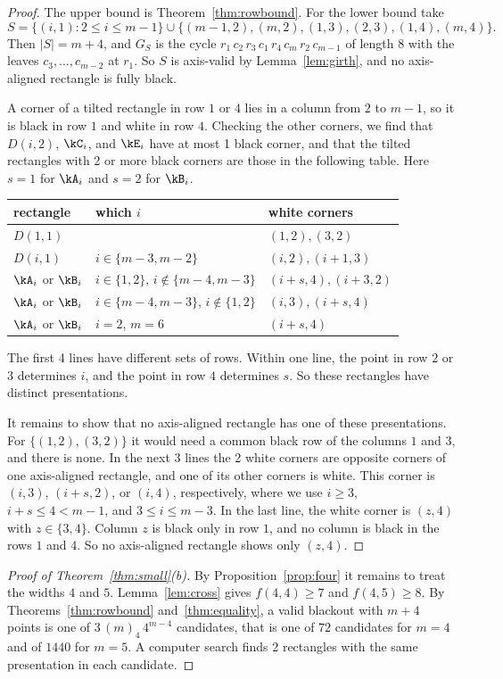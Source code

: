 \begin{proof}
The upper bound is Theorem~\ref{thm:rowbound}. For the lower bound take
\[
S=\{(i,1):2\le i\le m-1\}\cup\{(m-1,2),(m,2),(1,3),(2,3),(1,4),(m,4)\}.
\]
Then $|S|=m+4$, and $G_S$ is the cycle $r_1\,c_2\,r_3\,c_1\,r_4\,c_m\,r_2\,c_{m-1}$ of
length $8$ with the leaves $c_3,\dots,c_{m-2}$ at $r_1$. So $S$ is axis-valid by
Lemma~\ref{lem:girth}, and no axis-aligned rectangle is fully black.

A corner of a tilted rectangle in row $1$ or $4$ lies in a column from $2$ to $m-1$, so it
is black in row $1$ and white in row $4$. Checking the other corners, we find that $D(i,2)$, $\kC_i$, and $\kE_i$ have at most 1 black corner, and that the tilted
rectangles with 2 or more black corners are those in the following table. Here $s=1$ for
$\kA_i$ and $s=2$ for $\kB_i$.
\begin{center}\small
\begin{tabular}{@{}lll@{}}
\toprule
rectangle & which $i$ & white corners\\
\midrule
$D(1,1)$ & & $(1,2),(3,2)$\\
$D(i,1)$ & $i\in\{m-3,m-2\}$ & $(i,2),(i+1,3)$\\
$\kA_i$ or $\kB_i$ & $i\in\{1,2\}$, $i\notin\{m-4,m-3\}$ & $(i+s,4),(i+3,2)$\\
$\kA_i$ or $\kB_i$ & $i\in\{m-4,m-3\}$, $i\notin\{1,2\}$ & $(i,3),(i+s,4)$\\
$\kA_i$ or $\kB_i$ & $i=2$, $m=6$ & $(i+s,4)$\\
\bottomrule
\end{tabular}
\end{center}
The first 4 lines have different sets of rows. Within one line, the point in row $2$ or
$3$ determines $i$, and the point in row $4$ determines $s$. So these rectangles have
distinct presentations.

It remains to show that no axis-aligned rectangle has one of these presentations. For
$\{(1,2),(3,2)\}$ it would need a common black row of the columns $1$ and $3$, and there is
none. In the next 3 lines the 2 white corners are opposite corners of one axis-aligned
rectangle, and one of its other corners is white. This corner is $(i,3)$, $(i+s,2)$, or
$(i,4)$, respectively, where we use $i\ge3$, $i+s\le4<m-1$, and $3\le i\le m-3$. In the
last line, the white corner is $(z,4)$ with $z\in\{3,4\}$. Column $z$ is black only in row
$1$, and no column is black in the rows $1$ and $4$. So no axis-aligned rectangle shows
only $(z,4)$.
\end{proof}

\begin{proof}[Proof of Theorem~\ref{thm:small}(b)]
By Proposition~\ref{prop:four} it remains to treat the widths $4$ and $5$.
Lemma~\ref{lem:cross} gives $f(4,4)\ge7$ and $f(4,5)\ge8$. By Theorems~\ref{thm:rowbound}
and~\ref{thm:equality}, a valid blackout with $m+4$ points is one of $3\,(m)_4\,4^{m-4}$
candidates, that is one of $72$ candidates for $m=4$ and of $1440$ for $m=5$. A computer
search finds 2 rectangles with the same presentation in each candidate.
\end{proof}


